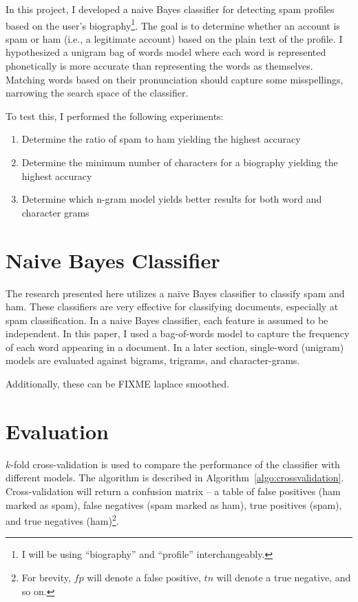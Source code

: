 \documentclass[10pt]{article}
\begin{document}
In this project, I developed a naive Bayes classifier for detecting spam
profiles based on the user's biography\footnote{I will be using ``biography''
  and ``profile'' interchangeably.}. The goal is to determine whether
an account is spam or ham (i.e., a legitimate account) based on the plain text
of the profile. I hypothesized a unigram bag of words model where each word is
represented phonetically is more accurate than representing the words as
themselves. Matching words based on their pronunciation should capture some
misspellings, narrowing the search space of the classifier.

  To test this, I performed the following experiments:

\begin{enumerate}
  \item Determine the ratio of spam to ham yielding the highest accuracy
  \item Determine the minimum number of characters for a biography yielding
    the highest accuracy
  \item Determine which n-gram model yields better results for both word and
    character grams
\end{enumerate}

\section{Naive Bayes Classifier}
The research presented here utilizes a naive Bayes classifier to classify spam
and ham. These classifiers are very effective for classifying
documents\cite[p182]{mitchell}, especially at spam
classification\cite{which-nb}. In a naive Bayes classifier, each feature is
assumed to be independent. In this paper, I used a bag-of-words model to
capture the frequency of each word appearing in a document. In a later
section, single-word (unigram) models are evaluated against bigrams, trigrams,
and character-grams.

Additionally, these can be FIXME laplace smoothed.

\section{Evaluation}
$k$-fold cross-validation is used to compare the performance of the classifier
with different models. The algorithm is described in
Algorithm~\ref{algo:crossvalidation}. Cross-validation will return a confusion
matrix -- a table of false positives (ham marked as spam), false negatives
(spam marked as ham), true positives (spam), and true negatives
(ham)\footnote{For brevity, $fp$ will denote a false positive, $tn$ will
  denote a true negative, and so on.}.
\end{document}
